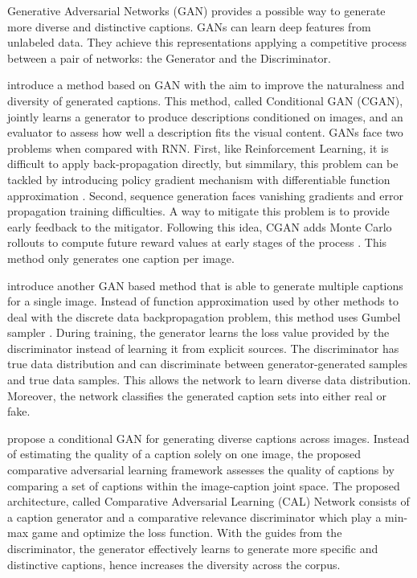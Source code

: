 Generative Adversarial Networks (GAN) provides a possible way to generate more diverse and distinctive captions. GANs can learn deep features from unlabeled data. They achieve this representations applying a competitive process between a pair of networks: the Generator and the Discriminator. 

\citet{Dai2017_CGAN} introduce a method based on GAN with the aim to improve the naturalness and diversity of generated captions. This method, called Conditional GAN (CGAN), jointly learns a generator to produce descriptions conditioned on images, and an evaluator to assess how well a description fits the visual content. GANs face two problems when compared with RNN. First, like Reinforcement Learning, it is difficult to apply back-propagation directly, but simmilary, this problem can be tackled by introducing policy gradient mechanism with differentiable function approximation \citep{Sutton1999}. Second, sequence generation faces vanishing gradients and error propagation training difficulties. A way to mitigate this problem is to provide early feedback to the mitigator. Following this idea, CGAN adds Monte Carlo rollouts to compute future reward values at early stages of the process \citep{Yu2017}. This method only generates one caption per image.

\cite{Shetty2017} introduce another GAN based method that is able to generate multiple captions for a single image. Instead of function approximation used by other methods to deal with the discrete data backpropagation problem, this method uses Gumbel sampler \citep{Jang2017}. During training, the generator learns the loss value provided by the discriminator instead of learning it from explicit sources. The discriminator has true data distribution and can discriminate between generator-generated samples and true data samples. This allows the network to learn diverse data distribution. Moreover, the network classifies the generated caption sets into either real or fake.

\cite{Li2018_CAL} propose a conditional GAN for generating diverse captions across images. Instead of estimating the quality of a caption solely on one image, the proposed comparative adversarial learning framework assesses the quality of captions by comparing a set of captions within the image-caption joint space. The proposed architecture, called Comparative Adversarial Learning (CAL) Network consists of a caption generator and a comparative relevance discriminator which play a min-max game and optimize the loss function. With the guides from the discriminator, the generator effectively learns to generate more specific and distinctive captions, hence increases the diversity across the corpus.

